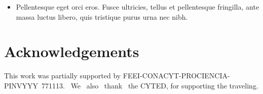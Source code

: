 \documentclass[portrait]{Hylangtechposter}
\begin{document}
\begin{multicols}{2}
\begin{itemize}
\item Pellentesque eget orci eros. Fusce ultricies, tellus et
  pellentesque fringilla, ante massa luctus libero, quis tristique
  purus urna nec nibh. 
\end{itemize}


\section*{Acknowledgements}
\small \textnormal{This work was partially supported by FEEI-CONACYT-PROCIENCIA-PINVYYY\textnumero{}~771113. ~We ~also ~thank ~the CYTED, for supporting the traveling.}



\end{multicols}
\end{document}
